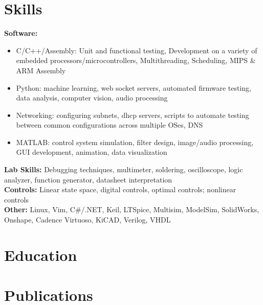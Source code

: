 \documentclass[11pt, a4paper]{article}
\begin{document}
\section*{Skills}
{\scriptsize
  \textbf{Software:}
  \begin{itemize}[noitemsep] %
    \item C/C++/Assembly: Unit and functional testing, Development on a variety of embedded processors/microcontrollers, Multithreading, Scheduling, MIPS \& ARM Assembly
    \item Python: machine learning, web socket servers, automated firmware testing, data analysis, computer vision, audio processing
    \item Networking: configuring subnets, dhcp servers, scripts to automate testing between common configurations across multiple OSes, DNS
    \item MATLAB: control system simulation, filter design, image/audio processing, GUI development, animation, data visualization
  \end{itemize}
  \textbf{Lab Skills:} Debugging techniques, multimeter, soldering, oscilloscope, logic analyzer, function generator, datasheet interpretation\\
  \textbf{Controls:} Linear state space, digital controls, optimal controls; nonlinear controls\\
  \textbf{Other:} Linux, Vim, C\#/.NET, Keil, LTSpice, Multisim, ModelSim, SolidWorks, Onshape, Cadence Virtuoso, KiCAD, Verilog, VHDL\par\noindent
}

\section*{Education}
{\scriptsize
  \educationWithDuration
}

\section*{Publications}
{\scriptsize
  \publications
}

\end{document}

